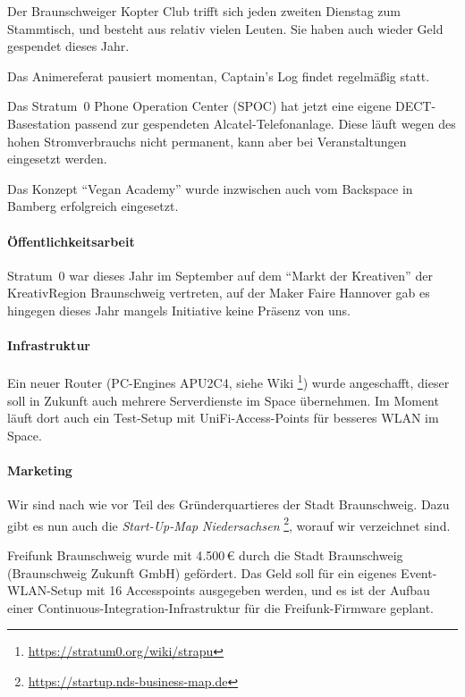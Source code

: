 \documentclass{s0minutes}
\begin{document}
Der Braunschweiger Kopter Club trifft sich jeden zweiten Dienstag zum
Stammtisch, und besteht aus relativ vielen Leuten. Sie haben auch wieder Geld
gespendet dieses Jahr.

Das Animereferat pausiert momentan, Captain's Log findet regelmäßig statt.

Das Stratum~0 Phone Operation Center (SPOC) hat jetzt eine eigene
DECT-Basestation passend zur gespendeten Alcatel-Telefonanlage. Diese läuft
wegen des hohen Stromverbrauchs nicht permanent, kann aber bei Veranstaltungen
eingesetzt werden.

Das Konzept "`Vegan Academy"' wurde inzwischen auch vom Backspace in Bamberg
erfolgreich eingesetzt.

\paragraph{Öffentlichkeitsarbeit}

Stratum~0 war dieses Jahr im September auf dem "`Markt der Kreativen"' der
KreativRegion Braunschweig vertreten, auf der Maker Faire Hannover gab es
hingegen dieses Jahr mangels Initiative keine Präsenz von uns.

\paragraph{Infrastruktur}

Ein neuer Router (PC-Engines APU2C4, siehe Wiki%
\footnote{\url{https://stratum0.org/wiki/strapu}}) wurde angeschafft, dieser
soll in Zukunft auch mehrere Serverdienste im Space übernehmen. Im Moment läuft
dort auch ein Test-Setup mit UniFi-Access-Points für besseres WLAN im Space.

\paragraph{Marketing}

Wir sind nach wie vor Teil des Gründerquartieres der Stadt Braunschweig. Dazu
gibt es nun auch die \emph{Start-Up-Map Niedersachsen}%
\footnote{\url{https://startup.nds-business-map.de}}, worauf wir verzeichnet
sind.

Freifunk Braunschweig wurde mit 4{.}500\,€ durch die Stadt Braunschweig
(Braunschweig Zukunft GmbH) gefördert. Das Geld soll für ein eigenes
Event-WLAN-Setup mit 16 Accesspoints ausgegeben werden, und es ist der Aufbau
einer Continuous-Integration-Infrastruktur für die Freifunk-Firmware geplant.
\end{document}

